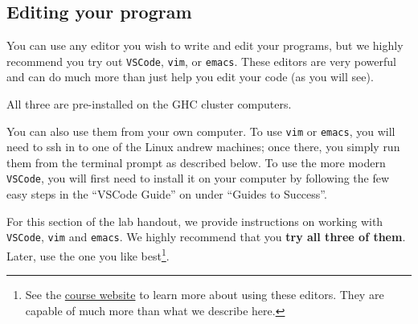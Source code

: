 \subsection*{Editing your program}

You can use any editor you wish to write and edit your programs, but
we highly recommend you try out
\lstinline[language={[coin]C}]'VSCode',
\lstinline[language={[coin]C}]'vim', or
\lstinline[language={[coin]C}]'emacs'. These editors are very powerful
and can do much more than just help you edit your code (as you will see).

All three are pre-installed on the GHC cluster computers.

You can also use them from your own computer.  To use
\lstinline[language={[coin]C}]'vim' or
\lstinline[language={[coin]C}]'emacs', you will need to ssh in to one
of the Linux andrew machines; once there, you simply run them
from the terminal prompt as described below.  To use the more modern
\lstinline[language={[coin]C}]'VSCode', you will first need to install
it on your computer by following the few easy steps in the ``VSCode
Guide'' on \gts{} under ``Guides to Success''.



For this section of the lab handout, we provide instructions on
working with \lstinline[language={[coin]C}]'VSCode',
\lstinline[language={[coin]C}]'vim' and
\lstinline[language={[coin]C}]'emacs'. We highly recommend that you
\textbf{try all three of them}.  Later, use the one you like
best\footnote{See the
  \href{http://www.cs.cmu.edu/~15122/about.shtml}{course website}
  to learn more about using these editors. They are capable
  of much more than what we describe here.}.

